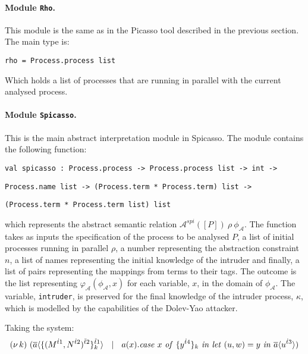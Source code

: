 \documentclass[10pt,a4paper,final,oneside,fleqn]{book}
\begin{document}
\paragraph{Module \texttt{Rho}.} This module is the same as in the Picasso tool described in the previous section.  The main type is:\vspace{4mm}

\noindent
\texttt{rho = Process.process list}\vspace{4mm}

\noindent
Which holds a list of processes that are running in parallel with the current analysed process.

\paragraph{Module \texttt{Spicasso}.} This is the main abstract interpretation module in Spicasso. The module contains the following function:\vspace{4mm}

\noindent
\texttt{val spicasso : Process.process -> Process.process list -> int ->}

\noindent
\texttt{Process.name list -> (Process.term * Process.term) list ->}

\noindent
\texttt{(Process.term * Process.term list) list}\vspace{4mm}

\noindent
which represents the abstract semantic relation $\mathcal{A}^{spi}(\![P]\!)~\rho~\phi_\mathcal{A}$.  The function takes as inputs the specification of the process to be analysed $P$, a list of initial processes running in parallel $\rho$, a number representing the abstraction constraint $n$, a list of names representing the initial knowledge of the intruder and finally, a list of pairs representing the mappings from terms to their tags.  The outcome is the list representing $\varphi_\mathcal{A}(\phi_\mathcal{A},x)$ for each variable, $x$, in the domain of $\phi_\mathcal{A}$. The variable, \texttt{intruder}, is preserved for the final knowledge of the intruder process, $\kappa$, which is modelled by the capabilities of the Dolev-Yao attacker.

Taking the system:
\[(\nu~\!k)~(\overline{a}\langle\{(M^{\dot{t}1},N^{\dot{t}2})^{\ddot{t}2}\}^{\ddot{t}1}_{k}\rangle~~\mid~~a(x).\mbox{{\itshape case\/} }x\mbox{ {\itshape of\/} }\{y^{\dot{t}4}\}_k\mbox{ {\itshape in\/} }\mbox{{\itshape let\/} }(u,w)=y\mbox{ {\itshape in\/} }\overline{a}\langle u^{\dot{t}3}\rangle)\]
\end{document}
